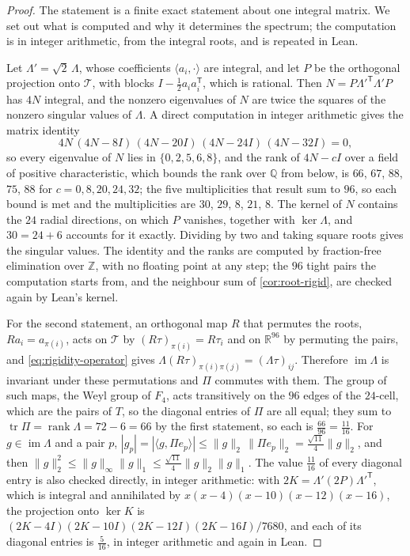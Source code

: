 \documentclass[11pt,reqno]{amsart}
\renewcommand{\_}{\origunderscore\allowbreak}
\numberwithin{equation}{section}
\theoremstyle{plain}
\theoremstyle{definition}
\theoremstyle{remark}
\begin{document}
\begin{proof}
The statement is a finite exact statement about one integral matrix.
We set out what is computed and why it determines the spectrum; the
computation is in integer arithmetic, from the integral roots, and is
repeated in Lean.

Let $\Lambda'=\sqrt2\,\Lambda$, whose coefficients $\langle a_i,\cdot\rangle$
are integral, and let $P$ be the orthogonal projection onto $\mathcal{T}$, with
blocks $I-\tfrac12a_ia_i^{\mathsf T}$, which is rational. Then
$N=P\Lambda'^{\mathsf T}\Lambda'P$ has $4N$ integral, and the nonzero
eigenvalues of $N$ are twice the squares of the nonzero singular values
of $\Lambda$. A direct computation in integer arithmetic gives the
matrix identity
\[
  4N\,(4N-8I)\,(4N-20I)\,(4N-24I)\,(4N-32I)=0 ,
\]
so every eigenvalue of $N$ lies in $\{0,2,5,6,8\}$, and the rank of
$4N-cI$ over a field of positive characteristic, which bounds the rank
over $\mathbb{Q}$ from below, is $66$, $67$, $88$, $75$, $88$ for
$c=0,8,20,24,32$; the five multiplicities that result sum to $96$, so
each bound is met and the multiplicities are $30$, $29$, $8$, $21$, $8$.
The kernel of $N$ contains the $24$ radial directions, on which $P$
vanishes, together with $\ker\Lambda$, and $30=24+6$ accounts for it
exactly. Dividing by two and taking square roots gives the singular
values. The identity and the ranks are computed by fraction-free
elimination over $\mathbb{Z}$, with no floating point at any step; the $96$
tight pairs the computation starts from, and the neighbour sum of
\cref{cor:root-rigid}, are checked again by Lean's kernel.

For the second statement, an orthogonal map $R$ that permutes the roots, $Ra_i=a_{\pi(i)}$, acts on
$\mathcal{T}$ by $(R\tau)_{\pi(i)}=R\tau_i$ and on $\mathbb{R}^{96}$ by permuting
the pairs, and \eqref{eq:rigidity-operator} gives
$\Lambda(R\tau)_{\pi(i)\pi(j)}=(\Lambda\tau)_{ij}$. Therefore $\operatorname{im}\Lambda$ is
invariant under these permutations and $\Pi$ commutes with them. The group
of such maps, the Weyl group of $F_4$, acts transitively on the $96$ edges of
the $24$-cell, which are the pairs of $T$, so the diagonal entries of $\Pi$
are all equal; they sum to $\operatorname{tr}\Pi=\operatorname{rank}\Lambda=72-6=66$
by the first statement, so each is $\tfrac{66}{96}=\tfrac{11}{16}$. For
$g\in\operatorname{im}\Lambda$ and a pair $p$,
$|g_p|=|\langle g,\Pi e_p\rangle|\le\|g\|_2\,\|\Pi e_p\|_2=\tfrac{\sqrt{11}}4\|g\|_2$,
and then $\|g\|_2^2\le\|g\|_\infty\|g\|_1\le\tfrac{\sqrt{11}}4\|g\|_2\|g\|_1$. The
value $\tfrac{11}{16}$ of every diagonal entry is also checked directly, in
integer arithmetic: with
$2K=\Lambda'(2P)\Lambda'^{\mathsf T}$, which is integral and annihilated by
$x(x-4)(x-10)(x-12)(x-16)$, the projection onto $\ker K$ is
$(2K-4I)(2K-10I)(2K-12I)(2K-16I)/7680$, and each of its diagonal entries is
$\tfrac5{16}$, in integer arithmetic and again in Lean.
\end{proof}
\end{document}
